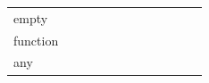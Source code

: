 \begin{table}[!h]
\begin{tabular}{ m{1.1cm} m{0.95cm} m{0.95cm} m{0.95cm} m{0.95cm} m{0.95cm} m{0.95cm} m{0.95cm} m{0.95cm} m{0.95cm} m{0.95cm} m{0.95cm}}
\multicolumn{1}{l|}{empty}    & \multicolumn{1}{l|}{\cellcolor[HTML]{036400}} & \multicolumn{1}{l|}{}                                                & \multicolumn{1}{l|}{}                         & \multicolumn{1}{l|}{}                         & \multicolumn{1}{l|}{}                         & \multicolumn{1}{l|}{}                         & \multicolumn{1}{l|}{}                         & \multicolumn{1}{l|}{}                         & \multicolumn{1}{l|}{\cellcolor[HTML]{036400}} & \multicolumn{1}{l|}{}                         & \multicolumn{1}{l|}{} \\ \cline{2-12} 
\multicolumn{1}{l|}{function} & \multicolumn{1}{l|}{\cellcolor[HTML]{036400}} & \multicolumn{1}{l|}{}                                                & \multicolumn{1}{l|}{}                         & \multicolumn{1}{l|}{}                         & \multicolumn{1}{l|}{}                         & \multicolumn{1}{l|}{}                         & \multicolumn{1}{l|}{}                         & \multicolumn{1}{l|}{}                         & \multicolumn{1}{l|}{}                         & \multicolumn{1}{l|}{\cellcolor[HTML]{036400}} & \multicolumn{1}{l|}{} \\ \cline{2-12} 
\multicolumn{1}{l|}{any}      & \multicolumn{1}{l|}{}                         & \multicolumn{1}{l|}{}                                                & \multicolumn{1}{l|}{}                         & \multicolumn{1}{l|}{}                         & \multicolumn{1}{l|}{}                         & \multicolumn{1}{l|}{}                         & \multicolumn{1}{l|}{}                         & \multicolumn{1}{l|}{}                         & \multicolumn{1}{l|}{}                         & \multicolumn{1}{l|}{}                         & \multicolumn{1}{l|}{} \\ \cline{2-12} 
\end{tabular}
     \label{tab:comp}
    \end{table}
\clearpage

